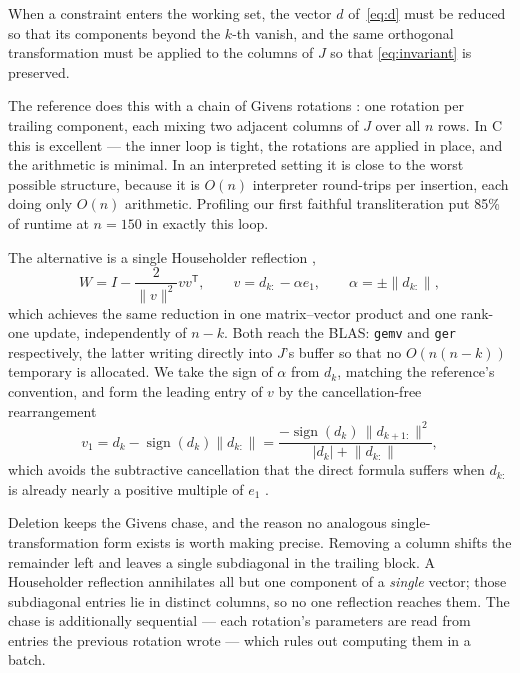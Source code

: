 \documentclass[11pt,a4paper]{article}
\theoremstyle{plain}
\theoremstyle{remark}
\newcommand{\T}{^{\mathsf{T}}}
\begin{document}
When a constraint enters the working set, the vector $d$ of~\eqref{eq:d} must be
reduced so that its components beyond the $k$-th vanish, and the same orthogonal
transformation must be applied to the columns of $J$ so that
\eqref{eq:invariant} is preserved.

The reference does this with a chain of Givens rotations \citep{givens1958}: one
rotation per trailing component, each mixing two adjacent columns of $J$ over all
$n$ rows. In C this is excellent --- the inner loop is tight, the rotations are
applied in place, and the arithmetic is minimal. In an interpreted setting it is
close to the worst possible structure, because it is $O(n)$ interpreter
round-trips per insertion, each doing only $O(n)$ arithmetic. Profiling our first
faithful transliteration put 85\% of runtime at $n = 150$ in exactly
this loop.

The alternative is a single Householder reflection \citep{householder1958},
\begin{equation}
  W = I - \frac{2}{\lVert v \rVert^2} v v\T ,
  \qquad v = d_{k:} - \alpha e_1, \qquad \alpha = \pm \lVert d_{k:} \rVert ,
\end{equation}
which achieves the same reduction in one matrix--vector product and one rank-one
update, independently of $n - k$. Both reach the BLAS: \texttt{gemv} and
\texttt{ger} respectively, the latter writing directly into $J$'s buffer so that
no $O(n(n-k))$ temporary is allocated. We take the sign of $\alpha$ from $d_k$,
matching the reference's convention, and form the leading entry of $v$ by the
cancellation-free rearrangement
\begin{equation}
  v_1 = d_k - \operatorname{sign}(d_k)\lVert d_{k:} \rVert
      = \frac{-\operatorname{sign}(d_k)\,\lVert d_{k+1:} \rVert^2}
             {|d_k| + \lVert d_{k:} \rVert},
\end{equation}
which avoids the subtractive cancellation that the direct formula suffers when
$d_{k:}$ is already nearly a positive multiple of $e_1$ \citep{golub2013}.

Deletion keeps the Givens chase, and the reason no analogous single-transformation
form exists is worth making precise. Removing a column shifts the remainder left
and leaves a single subdiagonal in the trailing block. A Householder reflection
annihilates all but one component of a \emph{single} vector; those subdiagonal
entries lie in distinct columns, so no one reflection reaches them. The chase is
additionally sequential --- each rotation's parameters are read from entries the
previous rotation wrote --- which rules out computing them in a batch.
\end{document}
